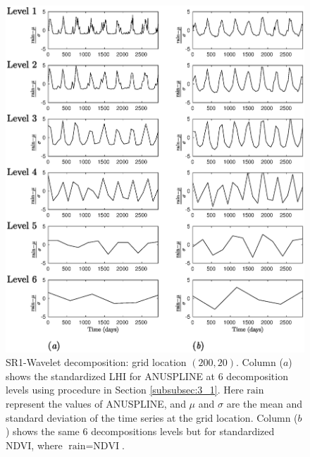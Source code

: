 {\vspace*{-0.2in}
\begin{figure}[!htbp]
\begin{center}
\includegraphics[width=0.8\columnwidth]{fig/point200_20GG}
\vspace*{-0.2in}
\caption{SR1-Wavelet decomposition: grid location $(200,20)$. 
Column ($a$) shows the standardized LHI for ANUSPLINE at $6$ decomposition levels using procedure in Section \ref{subsubsec:3_1}. Here $\text{rain}$ represent the values of ANUSPLINE, and $\mu$ and $\sigma$ are the mean and standard deviation of the time series at the grid location. Column ($b$) shows the same $6$ decompositions levels but for standardized NDVI, where $\text{rain} = \text{NDVI}$.}
\label{fig:level_decomposition2}
\end{center}
\end{figure}

}
